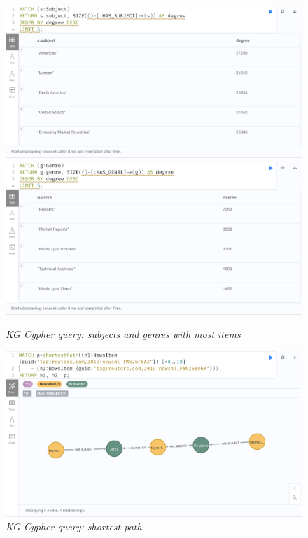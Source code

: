 \documentclass[11pt]{article}
\begin{document}
  \begin{figure}
    \includegraphics[scale=0.2]{02-subjects-with-most-items}
    \includegraphics[scale=0.2]{02-genres-with-most-items}
    \caption{\textit{KG Cypher query: subjects and genres with most items}}
  \end{figure}

  \begin{figure}
    \centerline{\includegraphics[scale=0.2]{03-shortest-path}}
    \caption{\textit{KG Cypher query: shortest path}}
  \end{figure}
\end{document}
